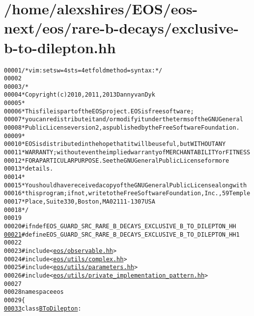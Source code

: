 \hypertarget{exclusive-b-to-dilepton_8hh_source}{
\section{/home/alexshires/EOS/eos-\/next/eos/rare-\/b-\/decays/exclusive-\/b-\/to-\/dilepton.hh}
}


\begin{footnotesize}\begin{alltt}
00001 \textcolor{comment}{/* vim: set sw=4 sts=4 et foldmethod=syntax : */}
00002 
00003 \textcolor{comment}{/*}
00004 \textcolor{comment}{ * Copyright (c) 2010, 2011, 2013 Danny van Dyk}
00005 \textcolor{comment}{ *}
00006 \textcolor{comment}{ * This file is part of the EOS project. EOS is free software;}
00007 \textcolor{comment}{ * you can redistribute it and/or modify it under the terms of the GNU General}
00008 \textcolor{comment}{ * Public License version 2, as published by the Free Software Foundation.}
00009 \textcolor{comment}{ *}
00010 \textcolor{comment}{ * EOS is distributed in the hope that it will be useful, but WITHOUT ANY}
00011 \textcolor{comment}{ * WARRANTY; without even the implied warranty of MERCHANTABILITY or FITNESS}
00012 \textcolor{comment}{ * FOR A PARTICULAR PURPOSE.  See the GNU General Public License for more}
00013 \textcolor{comment}{ * details.}
00014 \textcolor{comment}{ *}
00015 \textcolor{comment}{ * You should have received a copy of the GNU General Public License along with}
00016 \textcolor{comment}{ * this program; if not, write to the Free Software Foundation, Inc., 59 Temple}
00017 \textcolor{comment}{ * Place, Suite 330, Boston, MA  02111-1307  USA}
00018 \textcolor{comment}{ */}
00019 
00020 \textcolor{preprocessor}{#ifndef EOS\_GUARD\_SRC\_RARE\_B\_DECAYS\_EXCLUSIVE\_B\_TO\_DILEPTON\_HH}
\hypertarget{exclusive-b-to-dilepton_8hh_source_l00021}{}\hyperlink{exclusive-b-to-dilepton_8hh_aa7e7168345c14d0330e9c96cd34ea342}{00021} \textcolor{preprocessor}{}\textcolor{preprocessor}{#define EOS\_GUARD\_SRC\_RARE\_B\_DECAYS\_EXCLUSIVE\_B\_TO\_DILEPTON\_HH 1}
00022 \textcolor{preprocessor}{}
00023 \textcolor{preprocessor}{#include <\hyperlink{observable_8hh}{eos/observable.hh}>}
00024 \textcolor{preprocessor}{#include <\hyperlink{complex_8hh}{eos/utils/complex.hh}>}
00025 \textcolor{preprocessor}{#include <\hyperlink{parameters_8hh}{eos/utils/parameters.hh}>}
00026 \textcolor{preprocessor}{#include <\hyperlink{private__implementation__pattern_8hh}{eos/utils/private_implementation_pattern.hh}>}
00027 
00028 \textcolor{keyword}{namespace }eos
00029 \{
\hypertarget{exclusive-b-to-dilepton_8hh_source_l00033}{}\hyperlink{classeos_1_1BToDilepton}{00033}     \textcolor{keyword}{class }\hyperlink{classeos_1_1BToDilepton}{BToDilepton} :

\end{alltt}
\end{footnotesize}
